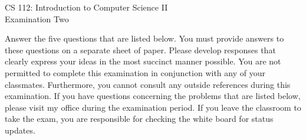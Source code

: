\documentclass[12pt]{article}
\def\widow#1{\vskip #1\vbadness10000\penalty-200\vskip-#1}
\begin{document}
\def\widow#1{\vskip #1\vbadness10000\penalty-200\vskip-#1}

\begin{center}

CS 112: Introduction to Computer Science II \\
Examination Two \\

\end{center}

\noindent
Answer the five questions that are listed below.  You must provide
answers to these questions on a separate sheet of paper.  Please
develop responses that clearly express your ideas in the most succinct
manner possible.  You are not permitted to complete this examination
in conjunction with any of your classmates.  Furthermore, you cannot
consult any outside references during this examination.  If you have
questions concerning the problems that are listed below, please visit
my office during the examination period.  If you leave the classroom
to take the exam, you are responsible for checking the white board for
status updates.
\end{document}
